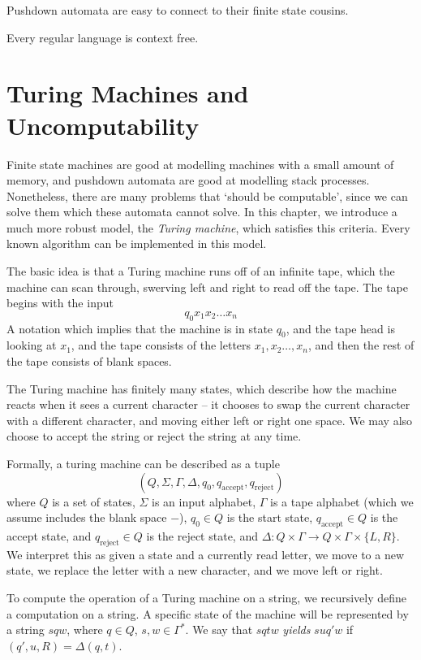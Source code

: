Pushdown automata are easy to connect to their finite state cousins.

\begin{corollary}
    Every regular language is context free.
\end{corollary}



\chapter{Turing Machines and Uncomputability}

Finite state machines are good at modelling machines with a small amount of memory, and pushdown automata are good at modelling stack processes. Nonetheless, there are many problems that `should be computable', since we can solve them which these automata cannot solve. In this chapter, we introduce a much more robust model, the \emph{Turing machine}, which satisfies this criteria. Every known algorithm can be implemented in this model.

The basic idea is that a Turing machine runs off of an infinite tape, which the machine can scan through, swerving left and right to read off the tape. The tape begins with the input
%
\[ q_0 x_1 x_2 \dots x_n \]
%
A notation which implies that the machine is in state $q_0$, and the tape head is looking at $x_1$, and the tape consists of the letters $x_1, x_2 \dots, x_n$, and then the rest of the tape consists of blank spaces.

The Turing machine has finitely many states, which describe how the machine reacts when it sees a current character -- it chooses to swap the current character with a different character, and moving either left or right one space. We may also choose to accept the string or reject the string at any time.

Formally, a turing machine can be described as a tuple
%
\[ (Q, \Sigma, \Gamma, \Delta, q_0, q_{\text{accept}}, q_{\text{reject}}) \]
%
where $Q$ is a set of states, $\Sigma$ is an input alphabet, $\Gamma$ is a tape alphabet (which we assume includes the blank space $-$), $q_0 \in Q$ is the start state, $q_{\text{accept}} \in Q$ is the accept state, and $q_{\text{reject}} \in Q$ is the reject state, and $\Delta: Q \times \Gamma \to Q \times \Gamma \times \{ L , R \}$. We interpret this as given a state and a currently read letter, we move to a new state, we replace the letter with a new character, and we move left or right.

To compute the operation of a Turing machine on a string, we recursively define a computation on a string. A specific state of the machine will be represented by a string $sqw$, where $q \in Q$, $s,w \in \Gamma^*$. We say that $sqtw$ \emph{yields} $suq'w$ if $(q', u, R) = \Delta(q,t)$.

